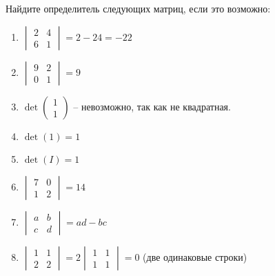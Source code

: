\documentclass[11pt, a4paper]{extarticle}
\begin{document}
\subsection{}
Найдите определитель следующих матриц, если это возможно:
		\begin{enumerate}[label=\alph*)]
			\item $\begin{vmatrix}
			2 & 4 \\
			6 & 1
			\end{vmatrix} = 2 - 24 = -22$
			
			\item $\begin{vmatrix}
			9 & 2 \\
			0 & 1
			\end{vmatrix} = 9$
			
			\item $\det\begin{pmatrix}
			1 \\
			1
			\end{pmatrix}$ – невозможно, так как не квадратная.
			
			\item $\det(1) = 1$
			
			\item $\det(I) = 1$
			
			\item $\begin{vmatrix}
			7 & 0 \\
			1 & 2
			\end{vmatrix} = 14$
			
			\item $\begin{vmatrix}
			a & b \\
			c & d
			\end{vmatrix} = ad - bc$
			
			\item $\begin{vmatrix}
			1 & 1 \\
			2 & 2
			\end{vmatrix} = 2\begin{vmatrix}
			1 & 1 \\
			1 & 1
			\end{vmatrix} = 0$ (две одинаковые строки)
		\end{enumerate}
\end{document}
